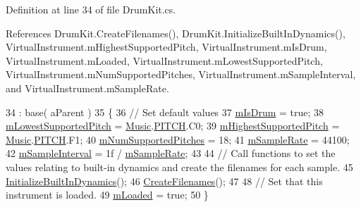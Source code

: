 Definition at line 34 of file Drum\+Kit.\+cs.



References Drum\+Kit.\+Create\+Filenames(), Drum\+Kit.\+Initialize\+Built\+In\+Dynamics(), Virtual\+Instrument.\+m\+Highest\+Supported\+Pitch, Virtual\+Instrument.\+m\+Is\+Drum, Virtual\+Instrument.\+m\+Loaded, Virtual\+Instrument.\+m\+Lowest\+Supported\+Pitch, Virtual\+Instrument.\+m\+Num\+Supported\+Pitches, Virtual\+Instrument.\+m\+Sample\+Interval, and Virtual\+Instrument.\+m\+Sample\+Rate.


\begin{DoxyCode}
34                                                        : base( aParent )
35     \{
36         \textcolor{comment}{// Set default values}
37         \hyperlink{group___v_i_base_pro_var_ga47dbd8aa02ab32b8f802adfd2d3d81de}{mIsDrum} = \textcolor{keyword}{true};
38         \hyperlink{group___v_i_base_pro_var_ga3cae52b1bcc0178a8a6b03c7aaf7aac8}{mLowestSupportedPitch} = \hyperlink{class_music}{Music}.\hyperlink{group___music_enums_ga508f69b199ea518f935486c990edac1d}{PITCH}.C0;
39         \hyperlink{group___v_i_base_pro_var_ga61fb2c33b53a0f663047779d7ceb18f3}{mHighestSupportedPitch} = \hyperlink{class_music}{Music}.\hyperlink{group___music_enums_ga508f69b199ea518f935486c990edac1d}{PITCH}.F1;
40         \hyperlink{group___v_i_base_pro_var_gafc759a16324cf9b3f230bcbf040afcd2}{mNumSupportedPitches} = 18;
41         \hyperlink{group___v_i_base_pro_var_ga80b3d2ff29b27698eea6bcf2f8ddc5d7}{mSampleRate} = 44100;
42         \hyperlink{group___v_i_base_pro_var_ga20c1d3d25ea666378d72c833d160ae2e}{mSampleInterval} = 1f / \hyperlink{group___v_i_base_pro_var_ga80b3d2ff29b27698eea6bcf2f8ddc5d7}{mSampleRate};
43 
44         \textcolor{comment}{// Call functions to set the values relating to built-in dynamics and create the filenames for each
       sample.}
45         \hyperlink{group___drum_virt_func_gad14c6155e6ec62f26a30261e273d6379}{InitializeBuiltInDynamics}();
46         \hyperlink{group___drum_virt_func_ga25bb92cf56bc1b3434465faf73cd09cf}{CreateFilenames}();
47 
48         \textcolor{comment}{// Set that this instrument is loaded.}
49         \hyperlink{group___v_i_base_pro_var_ga8978807d1878db5aae91fbd057c46097}{mLoaded} = \textcolor{keyword}{true};
50     \}
\end{DoxyCode}
